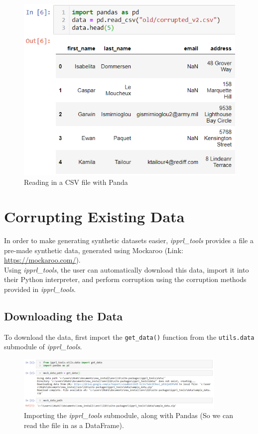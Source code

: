 \documentclass[titlepage, 11pt]{article}
\newcommand{\pkgname}{\textit{ipprl\_tools}}
\begin{document}
\begin{figure}[H]
    \centering
    \includegraphics{imgs/PandasRead.png}
    \caption{Reading in a CSV file with Panda}
    \label{fig:my_label}
\end{figure}

\section{Corrupting Existing Data}
In order to make generating synthetic datasets easier, \pkgname{} provides a file a pre-made synthetic data, generated using Mockaroo (Link: \url{https://mockaroo.com/}).
\\
\noindent Using \pkgname{}, the user can automatically download this data, import it into their Python interpreter, and perform corruption using the corruption methods provided in \pkgname{}. 
\subsection{Downloading the Data}
To download the data, first import the \verb|get_data()| function from the \verb|utils.data| submodule of \pkgname{}.

\begin{figure}[H]
    \centering
    \includegraphics[width=0.9\textwidth]{imgs/mock_data1.PNG}
    \caption{Importing the \pkgname{} submodule, along with Pandas (So we can read the file in as a DataFrame).}
    \label{fig:my_label}
\end{figure}
\end{document}

